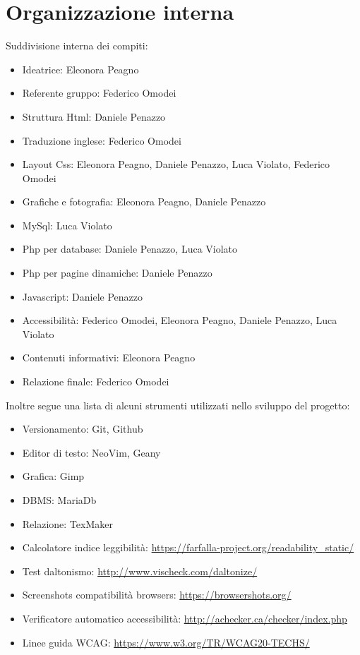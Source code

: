\section{Organizzazione interna}
Suddivisione interna dei compiti: 
\begin{itemize}
\item Ideatrice: Eleonora Peagno
\item Referente gruppo: Federico Omodei
\item Struttura Html: Daniele Penazzo
\item Traduzione inglese: Federico Omodei
\item Layout Css: Eleonora Peagno, Daniele Penazzo, Luca Violato, Federico Omodei
\item Grafiche e fotografia: Eleonora Peagno, Daniele Penazzo
\item MySql: Luca Violato
\item Php per database: Daniele Penazzo, Luca Violato
\item Php per pagine dinamiche: Daniele Penazzo
\item Javascript: Daniele Penazzo
\item Accessibilità: Federico Omodei, Eleonora Peagno, Daniele Penazzo, Luca Violato
\item Contenuti informativi: Eleonora Peagno
\item Relazione finale: Federico Omodei
\end{itemize}

\pagebreak

Inoltre segue una lista di alcuni strumenti utilizzati nello sviluppo del progetto:
\begin{itemize}
\item Versionamento: Git, Github
\item Editor di testo: NeoVim, Geany
\item Grafica: Gimp
\item DBMS: MariaDb
\item Relazione: TexMaker
\item Calcolatore indice leggibilità: \url{https://farfalla-project.org/readability_static/}
\item Test daltonismo: \url{http://www.vischeck.com/daltonize/}
\item Screenshots compatibilità browsers: \url{https://browsershots.org/}
\item Verificatore automatico accessibilità: \url{http://achecker.ca/checker/index.php}
\item Linee guida WCAG: \url{https://www.w3.org/TR/WCAG20-TECHS/}
\end{itemize}